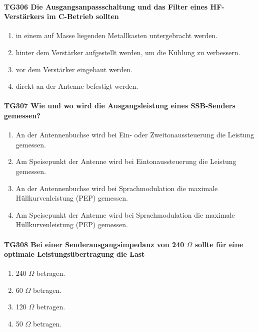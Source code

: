 \documentclass[8pt]{article}
\begin{document}
\paragraph*{TG306 Die Ausgangsanpassschaltung und das Filter eines HF-Verstärkers im C-Betrieb sollten}
\begin{enumerate}[nolistsep,label=\Alph*]
\item in einem auf Masse liegenden Metallkasten untergebracht werden. 
\item hinter dem Verstärker aufgestellt werden, um die Kühlung zu verbessern.
\item vor dem Verstärker eingebaut werden.
\item direkt an der Antenne befestigt werden.
\end{enumerate}

\paragraph*{TG307 Wie und wo wird die Ausgangsleistung eines SSB-Senders gemessen?}
\begin{enumerate}[nolistsep,label=\Alph*]
\item An der Antennenbuchse wird bei Ein- oder Zweitonaussteuerung die Leistung gemessen.
\item Am Speisepunkt der Antenne wird bei Eintonaussteuerung die Leistung gemessen.
\item An der Antennenbuchse wird bei Sprachmodulation die maximale Hüllkurvenleistung (PEP) gemessen.
\item Am Speisepunkt der Antenne wird bei Sprachmodulation die maximale Hüllkurvenleistung (PEP) gemessen.
\end{enumerate}

\paragraph*{TG308 Bei einer Senderausgangsimpedanz von 240 $\Omega$ sollte für eine optimale Leistungsübertragung die Last}
\begin{enumerate}[nolistsep,label=\Alph*]
\item 240 $\Omega$ betragen.
\item 60 $\Omega$ betragen.
\item 120 $\Omega$ betragen.
\item 50 $\Omega$ betragen.
\end{enumerate}
\end{document}
